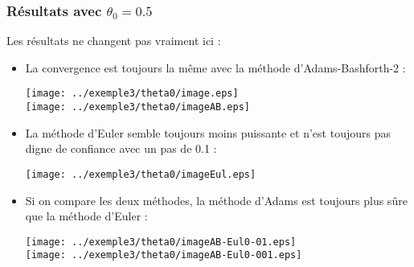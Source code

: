 \subsubsection{Résultats avec $\theta_0=0.5$}
Les résultats ne changent pas vraiment ici :
\begin{itemize}
	\item La convergence est toujours la même avec la méthode d'Adams-Bashforth-2 :
\begin{center}
\texttt{[image: ../exemple3/theta0/image.eps]}\\
\texttt{[image: ../exemple3/theta0/imageAB.eps]}
\end{center}

	\item La méthode d'Euler semble toujours moins puissante et n'est toujours pas digne de confiance avec un pas de 0.1 :
\begin{center}
\texttt{[image: ../exemple3/theta0/imageEul.eps]}
\end{center}

	\item Si on compare les deux méthodes, la méthode d'Adams est toujours plus sûre que la méthode d'Euler :
\begin{center}
\texttt{[image: ../exemple3/theta0/imageAB-Eul0-01.eps]}\\
\texttt{[image: ../exemple3/theta0/imageAB-Eul0-001.eps]}
\end{center}
\end{itemize}
